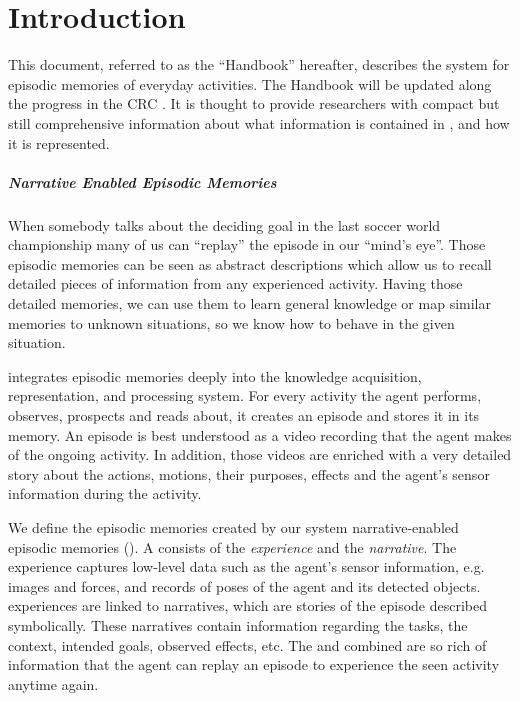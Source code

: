 \chapter{Introduction}

This document, referred to as the ``\neem Handbook'' hereafter,
describes the \ease system for episodic memories of everyday activities.
The \neem Handbook will be updated along the progress in the CRC \ease.
It is thought to provide \ease researchers with compact but still comprehensive
information about what information is contained in \neems, and how it is represented.

\paragraph{Narrative Enabled Episodic Memories}
When somebody talks about the deciding goal in the last soccer world championship many of us can ``replay'' the episode in our ``mind's eye''.
Those episodic memories can be seen as abstract descriptions which allow us to recall detailed pieces of information from any experienced activity.
Having those detailed memories, we can use them to learn general knowledge or map similar memories to unknown situations, so we know how to behave in the given situation.

\ease integrates episodic memories deeply into the knowledge acquisition, representation, and processing system. 
For every activity the agent performs, observes, prospects and reads about, it creates an episode and stores it in its memory.
An episode is best understood as a video recording that the agent makes of the ongoing activity.
In addition, those videos are enriched with a very detailed story about the actions, motions, their purposes, effects and the agent's sensor information during the activity.

We define the episodic memories created by our system narrative-enabled episodic memories (\neems).
A \neem consists of the \emph{\neem experience} and the \emph{\neem narrative}.
The \neem experience captures low-level data such as the agent's sensor information, e.g. images and forces, and records of poses of the agent and its detected objects.
\neem experiences are linked to \neem narratives, which are stories of the episode described symbolically.
These narratives contain information regarding the tasks, the context, intended goals, observed effects, etc.
The \neemexp and \neemnar combined are so rich of information that the agent can replay an episode to experience the seen activity anytime again.

